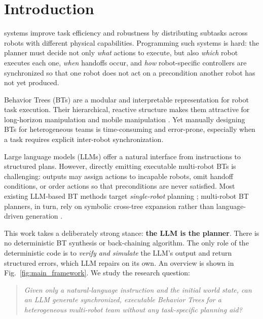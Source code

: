 \documentclass[journal]{IEEEtran}
\begin{document}
\section{Introduction}
 systems improve task efficiency and robustness by distributing subtasks across robots with different physical capabilities. Programming such systems is hard: the planner must decide not only \emph{what} actions to execute, but also \emph{which} robot executes each one, \emph{when} handoffs occur, and \emph{how} robot-specific controllers are synchronized so that one robot does not act on a precondition another robot has not yet produced.

Behavior Trees (BTs) are a modular and interpretable representation for robot task execution. Their hierarchical, reactive structure makes them attractive for long-horizon manipulation and mobile manipulation \cite{colledanchise2018bt,iovino2022survey}. Yet manually designing BTs for heterogeneous teams is time-consuming and error-prone, especially when a task requires explicit inter-robot synchronization.

Large language models (LLMs) offer a natural interface from instructions to structured plans. However, directly emitting executable multi-robot BTs is challenging: outputs may assign actions to incapable robots, omit handoff conditions, or order actions so that preconditions are never satisfied. Most existing LLM-based BT methods target \emph{single-robot} planning \cite{ao2025llmasbtplanner}; multi-robot BT planners, in turn, rely on symbolic cross-tree expansion rather than language-driven generation \cite{cai2025mrbtp}.

This work takes a deliberately strong stance: \textbf{the LLM is the planner}. There is no deterministic BT synthesis or back-chaining algorithm. The only role of the deterministic code is to \emph{verify and simulate} the LLM's output and return structured errors, which LLM repairs on its own. An overview is shown in Fig.~\ref{fig:main_framework}. We study the research question:
\begin{quote}
\emph{Given only a natural-language instruction and the initial world state, can an LLM generate synchronized, executable Behavior Trees for a heterogeneous multi-robot team without any task-specific planning aid?}
\end{quote}
\end{document}
